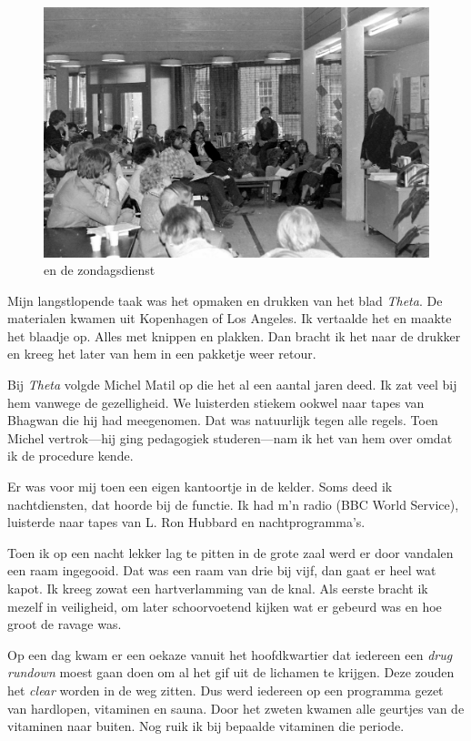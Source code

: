 \documentclass[10pt,twoside, openright]{memoir}
\begin{document}
\begin{figure}
\includegraphics[width=\textwidth]{img/ch44/9-25-2009_002}
\caption*{\footnotesizePiet en de zondagsdienst}
\end{figure}

Mijn langstlopende taak was het opmaken en drukken van het blad \emph{Theta}. De materialen kwamen uit Kopenhagen of Los Angeles. Ik vertaalde het en maakte het blaadje op. Alles met knippen en plakken. Dan bracht ik het naar de drukker en kreeg het later van hem in een pakketje weer retour. 

Bij \emph{Theta} volgde Michel Matil op die het al een aantal jaren deed. Ik zat veel bij hem vanwege de gezelligheid. We luisterden stiekem ookwel naar tapes van Bhagwan die hij had meegenomen. Dat was natuurlijk tegen alle regels. Toen Michel vertrok---hij ging pedagogiek studeren---nam ik het van hem over omdat ik de procedure kende. 

Er was voor mij toen een eigen kantoortje in de kelder. Soms deed ik nachtdiensten, dat hoorde bij de functie. Ik had m’n radio (BBC World Service), luisterde naar tapes van L. Ron Hubbard en nachtprogramma’s. 

Toen ik op een nacht lekker lag te pitten in de grote zaal werd er door vandalen een raam ingegooid. Dat was een raam van drie bij vijf, dan gaat er heel wat kapot. Ik kreeg zowat een hartverlamming van de knal. Als eerste bracht ik mezelf in veiligheid, om later schoorvoetend kijken wat er gebeurd was en hoe groot de ravage was.

Op een dag kwam er een oekaze vanuit het hoofdkwartier dat iedereen een \emph{drug rundown} moest gaan doen om al het gif uit de lichamen te krijgen. Deze zouden het \emph{clear} worden in de weg zitten. Dus werd iedereen op een programma gezet van hardlopen, vitaminen en sauna. Door het zweten kwamen alle geurtjes van de vitaminen naar buiten. Nog ruik ik bij bepaalde vitaminen die periode. 
\end{document}
